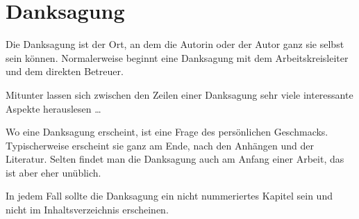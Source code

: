 %
%
%

\chapter*{Danksagung}

Die Danksagung ist der Ort, an dem die Autorin oder der Autor ganz sie selbst sein können. Normalerweise beginnt eine Danksagung mit dem Arbeitskreisleiter und dem direkten Betreuer.

Mitunter lassen sich zwischen den Zeilen einer Danksagung sehr viele interessante Aspekte herauslesen \ldots

Wo eine Danksagung erscheint, ist eine Frage des persönlichen Geschmacks. Typischerweise erscheint sie ganz am Ende, nach den Anhängen und der Literatur. Selten findet man die Danksagung auch am Anfang einer Arbeit, das ist aber eher unüblich.

In jedem Fall sollte die Danksagung ein nicht nummeriertes Kapitel sein und nicht im Inhaltsverzeichnis erscheinen.


